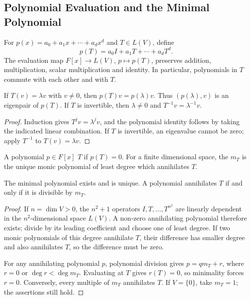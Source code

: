\subsection{Polynomial Evaluation and the Minimal Polynomial}

For $p(x)=a_0+a_1x+\cdots+a_dx^d$ and $T\in L(V)$, define
\begin{equation*}
p(T)=a_0I+a_1T+\cdots+a_dT^d.
\end{equation*}
The evaluation map $F[x]\to L(V)$, $p\mapsto p(T)$, preserves addition, multiplication, scalar multiplication and identity. In particular, polynomials in $T$ commute with each other and with $T$.

\begin{Theorem}\label{thm:PolynomialEigenvector}
If $T(v)=\lambda v$ with $v\ne0$, then $p(T)v=p(\lambda)v$. Thus $(p(\lambda),v)$ is an eigenpair of $p(T)$. If $T$ is invertible, then $\lambda\ne0$ and $T^{-1}v=\lambda^{-1}v$.
\end{Theorem}
\begin{proof}
Induction gives $T^jv=\lambda^jv$, and the polynomial identity follows by taking the indicated linear combination. If $T$ is invertible, an eigenvalue cannot be zero; apply $T^{-1}$ to $T(v)=\lambda v$.
\end{proof}

\begin{Definition}
A polynomial $p\in F[x]$  $T$ if $p(T)=0$. For a finite dimensional space, the  $m_T$ is the unique monic polynomial of least degree which annihilates $T$.
\end{Definition}

\begin{Theorem}\label{thm:MinimalPolynomial}
The minimal polynomial exists and is unique. A polynomial annihilates $T$ if and only if it is divisible by $m_T$.
\end{Theorem}
\begin{proof}
If $n=\dim V>0$, the $n^2+1$ operators $I,T,\ldots,T^{n^2}$ are linearly dependent in the $n^2$-dimensional space $L(V)$. A non-zero annihilating polynomial therefore exists; divide by its leading coefficient and choose one of least degree. If two monic polynomials of this degree annihilate $T$, their difference has smaller degree and also annihilates $T$, so the difference must be zero.

For any annihilating polynomial $p$, polynomial division gives $p=qm_T+r$, where $r=0$ or $\deg r<\deg m_T$. Evaluating at $T$ gives $r(T)=0$, so minimality forces $r=0$. Conversely, every multiple of $m_T$ annihilates $T$. If $V=\{0\}$, take $m_T=1$; the assertions still hold.
\end{proof}

